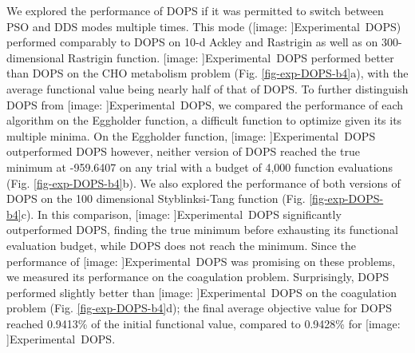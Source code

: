 \documentclass{bmcart}
\def\texttt{[image: ]}
\begin{document}
We explored the performance of DOPS if it was permitted to switch between PSO and DDS modes multiple times.
This mode (\texttt{Experimental~DOPS}) performed comparably to DOPS on 10-d Ackley and Rastrigin as well as on 300-dimensional Rastrigin function.
\texttt{Experimental~DOPS} performed better than DOPS on the CHO metabolism problem (Fig. \ref{fig-exp-DOPS-b4}a),
with the average functional value being nearly half of that of DOPS.
To further distinguish DOPS from \texttt{Experimental~DOPS}, we compared the performance of each algorithm on the Eggholder function,
a difficult function to optimize given its its multiple minima.
On the Eggholder function, \texttt{Experimental~DOPS} outperformed DOPS however, neither version of DOPS reached the true minimum at -959.6407 on any trial with a budget of 4,000 function evaluations (Fig. \ref{fig-exp-DOPS-b4}b).
We also explored the performance of both versions of DOPS on the 100 dimensional Styblinksi-Tang function \cite{jamil2013literature} (Fig. \ref{fig-exp-DOPS-b4}c).
In this comparison, \texttt{Experimental~DOPS} significantly outperformed DOPS, finding the true minimum before exhausting its functional evaluation budget, while DOPS does not reach the minimum.
Since the performance of \texttt{Experimental~DOPS} was promising on these problems, we measured its performance on the coagulation problem.
Surprisingly, DOPS performed slightly better than \texttt{Experimental~DOPS} on the coagulation problem (Fig. \ref{fig-exp-DOPS-b4}d);
the final average objective value for DOPS reached 0.9413\% of the initial functional value, compared to 0.9428\% for \texttt{Experimental~DOPS}.
\end{document}
